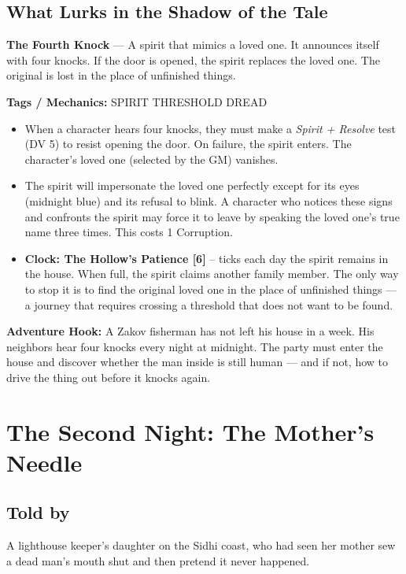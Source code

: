 \documentclass[10pt,twoside]{book}
\newcommand{\tag}[1]{\textsc{#1}}
\begin{document}
\section*{What Lurks in the Shadow of the Tale}
\begin{infobox}
\textbf{The Fourth Knock} --- A spirit that mimics a loved one. It announces itself with four knocks. If the door is opened, the spirit replaces the loved one. The original is lost in the place of unfinished things.

\textbf{Tags / Mechanics:} \tag{SPIRIT} \tag{THRESHOLD} \tag{DREAD}

\begin{itemize}
\item When a character hears four knocks, they must make a \textit{Spirit + Resolve} test (DV 5) to resist opening the door. On failure, the spirit enters. The character's loved one (selected by the GM) vanishes.
\item The spirit will impersonate the loved one perfectly except for its eyes (midnight blue) and its refusal to blink. A character who notices these signs and confronts the spirit may force it to leave by speaking the loved one's true name three times. This costs 1 Corruption.
\item \textbf{Clock: The Hollow's Patience [6]} -- ticks each day the spirit remains in the house. When full, the spirit claims another family member. The only way to stop it is to find the original loved one in the place of unfinished things --- a journey that requires crossing a threshold that does not want to be found.
\end{itemize}

\textbf{Adventure Hook:} A Zakov fisherman has not left his house in a week. His neighbors hear four knocks every night at midnight. The party must enter the house and discover whether the man inside is still human --- and if not, how to drive the thing out before it knocks again.
\end{infobox}

\chapter{The Second Night: The Mother's Needle}

\section*{Told by}
A lighthouse keeper's daughter on the Sidhi coast, who had seen her mother sew a dead man's mouth shut and then pretend it never happened.
\end{document}
